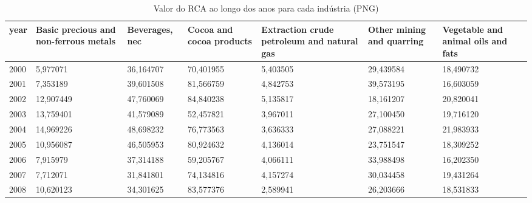 \begin{table}
\centering
\caption{Valor do RCA ao longo dos anos para cada indústria (PNG)}
\begin{tabular}{p{1cm}p{2cm}p{2cm}p{2cm}p{2cm}p{2cm}p{2cm}}
\toprule
 year &  Basic precious and non-ferrous metals &  Beverages, nec &  Cocoa and cocoa products &  Extraction crude petroleum and natural gas &  Other mining and quarring &  Vegetable and animal oils and fats \\
\midrule
 2000 &                               5,977071 &       36,164707 &                 70,401955 &                                    5,403505 &                  29,439584 &                           18,490732 \\
 2001 &                               7,353189 &       39,601508 &                 81,566759 &                                    4,842753 &                  39,573195 &                           16,603059 \\
 2002 &                              12,907449 &       47,760069 &                 84,840238 &                                    5,135817 &                  18,161207 &                           20,820041 \\
 2003 &                              13,759401 &       41,579089 &                 52,457821 &                                    3,967011 &                  27,100450 &                           19,716120 \\
 2004 &                              14,969226 &       48,698232 &                 76,773563 &                                    3,636333 &                  27,088221 &                           21,983933 \\
 2005 &                              10,956087 &       46,505953 &                 80,924632 &                                    4,136014 &                  23,751547 &                           18,309252 \\
 2006 &                               7,915979 &       37,314188 &                 59,205767 &                                    4,066111 &                  33,988498 &                           16,202350 \\
 2007 &                               7,712071 &       31,841801 &                 74,134816 &                                    4,157274 &                  30,034458 &                           19,431264 \\
 2008 &                              10,620123 &       34,301625 &                 83,577376 &                                    2,589941 &                  26,203666 &                           18,531833 \\

\end{tabular}
\end{table}
